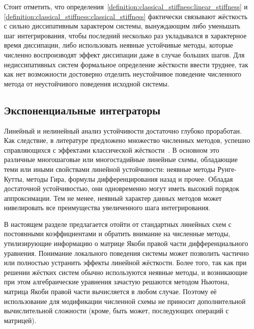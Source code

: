 Стоит отметить, что определения~\ref{definition:classical_stiffness:linear_stiffness}
и \ref{definition:classical_stiffness:classical_stiffness}
фактически связывают жёсткость с сильно диссипативным характером системы,
вынуждающим либо уменьшать шаг интегрирования,
чтобы последний несколько раз укладывался в характерное время диссипации,
либо использовать неявные устойчивые методы,
которые численно воспроизводят эффект диссипации даже в случае больших шагов.
Для недиссипативных систем формальное определение жёсткости ввести труднее,
так как нет возможности достоверно отделить неустойчивое поведение численного метода
от неустойчивого поведения исходной системы.



\subsection{Экспоненциальные интеграторы}
\label{subsection:stiffness:exponential_integrators}

Линейный и нелинейный анализ устойчивости достаточно глубоко проработан.
Как следствие, в литературе предложено множество численных методов,
успешно справляющихся с эффектами
классической жёсткости~\cite{auzinger1993modern, dahlquist1963special, dahlquist1975stability, liu2019study, heirer1999solvingode2, lambert1991methods}.
В основном это различные многошаговые или многостадийные линейные схемы, обладающие теми или иными свойствами линейной устойчивости:
неявные методы Рунге-Кутты, методы Гира, формулы дифференцирования назад и прочее.
Обладая достаточной устойчивостью, они одновременно могут иметь высокий порядок аппроксимации.
Тем не менее, неявный характер данных методов может нивелировать все преимущества увеличенного шага интегрирования.

В настоящем разделе предлагается отойти от стандартных линейных схем с постоянными коэффициентами
и обратить внимание на численные методы,
утилизирующие информацию о матрице Якоби правой части дифференциального уравнения.
Понимание локального поведения системы может позволить частично или полностью устранить эффекты линейной жёсткости.
Более того, так как при решении жёстких систем обычно используются неявные методы,
и возникающие при этом алгебраические уравнения зачастую решаются методом Ньютона,
матрица Якоби правой части вычисляется в любом случае.
Поэтому её использование для модификации численной схемы не приносит дополнительной вычислительной сложности
(кроме, быть может, последующих операций с матрицей).

